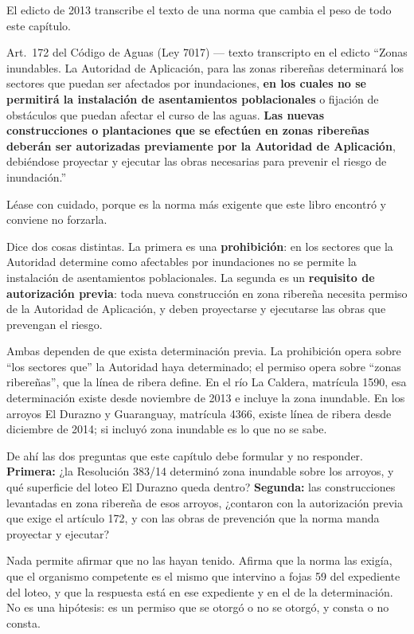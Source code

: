El edicto de 2013 transcribe el texto de una norma que cambia el peso de todo este capítulo.

\begin{ficha}{Art.\ 172 del Código de Aguas (Ley 7017) --- texto transcripto en el edicto}
``Zonas inundables. La Autoridad de Aplicación, para las zonas ribereñas determinará los sectores que puedan ser afectados por inundaciones, \textbf{en los cuales no se permitirá la instalación de asentamientos poblacionales} o fijación de obstáculos que puedan afectar el curso de las aguas. \textbf{Las nuevas construcciones o plantaciones que se efectúen en zonas ribereñas deberán ser autorizadas previamente por la Autoridad de Aplicación}, debiéndose proyectar y ejecutar las obras necesarias para prevenir el riesgo de inundación.''
\end{ficha}

\begin{cautela}
Léase con cuidado, porque es la norma más exigente que este libro encontró y conviene no forzarla.

Dice dos cosas distintas. La primera es una \textbf{prohibición}: en los sectores que la Autoridad determine como afectables por inundaciones no se permite la instalación de asentamientos poblacionales. La segunda es un \textbf{requisito de autorización previa}: toda nueva construcción en zona ribereña necesita permiso de la Autoridad de Aplicación, y deben proyectarse y ejecutarse las obras que prevengan el riesgo.

Ambas dependen de que exista determinación previa. La prohibición opera sobre ``los sectores que'' la Autoridad haya determinado; el permiso opera sobre ``zonas ribereñas'', que la línea de ribera define. En el río La Caldera, matrícula 1590, esa determinación existe desde noviembre de 2013 e incluye la zona inundable. En los arroyos El Durazno y Guaranguay, matrícula 4366, existe línea de ribera desde diciembre de 2014; si incluyó zona inundable es lo que no se sabe.

De ahí las dos preguntas que este capítulo debe formular y no responder. \textbf{Primera:} ¿la Resolución 383/14 determinó zona inundable sobre los arroyos, y qué superficie del loteo El Durazno queda dentro? \textbf{Segunda:} las construcciones levantadas en zona ribereña de esos arroyos, ¿contaron con la autorización previa que exige el artículo 172, y con las obras de prevención que la norma manda proyectar y ejecutar?

Nada permite afirmar que no las hayan tenido. Afirma que la norma las exigía, que el organismo competente es el mismo que intervino a fojas 59 del expediente del loteo, y que la respuesta está en ese expediente y en el de la determinación. No es una hipótesis: es un permiso que se otorgó o no se otorgó, y consta o no consta.
\end{cautela}

